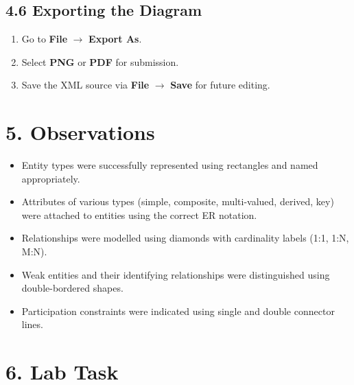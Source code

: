 \documentclass[12pt,a4paper]{article}
\begin{document}
\subsection*{4.6 Exporting the Diagram}
\begin{enumerate}
    \item Go to \textbf{File} $\to$ \textbf{Export As}.
    \item Select \textbf{PNG} or \textbf{PDF} for submission.
    \item Save the XML source via \textbf{File} $\to$ \textbf{Save} for future editing.
\end{enumerate}


\section*{5. Observations}
\begin{itemize}
    \item Entity types were successfully represented using rectangles and named appropriately.
    \item Attributes of various types (simple, composite, multi-valued, derived, key) were attached
          to entities using the correct ER notation.
    \item Relationships were modelled using diamonds with cardinality labels (1:1, 1:N, M:N).
    \item Weak entities and their identifying relationships were distinguished using double-bordered
          shapes.
    \item Participation constraints were indicated using single and double connector lines.
\end{itemize}

\section*{6. Lab Task}
\end{document}
